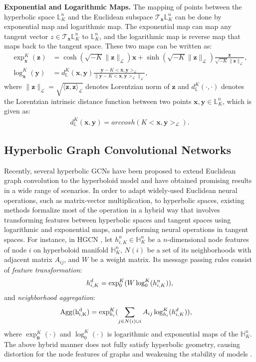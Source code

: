 \documentclass[sigconf]{acmart}
\newcommand{\Lc}{\mathcal{L}}
\newcommand{\lorentz}{\mathbb{L}^n_K}
\newcommand{\linner}[2]{\langle \mathbf{#1},\mathbf{#2}\rangle_\Lc}
\newcommand{\tangent}[1]{\mathcal{T}_{\mathbf{#1}}\mathbb{L}^n_K}
\newcommand{\logmap}[2]{\log_#1^K(#2)}
\newcommand{\expmap}[2]{\exp_\mathbf{#1}^K(\mathbf{#2})}
\begin{document}
\noindent\textbf{Exponential and Logarithmic Maps.} The mapping of points between the hyperbolic space $\lorentz$ and the Euclidean subspace $\tangent{x}$ can be done by exponential map and logarithmic map. The exponential map can map any tangent vector $z\in\tangent{x}$ to $\lorentz$, and the logarithmic map is reverse map that maps back to the tangent space. These two maps can be written as:
\begin{align}
\label{eq4}
\expmap{x}{z} &= \cosh(\sqrt{-K}\lVert\mathbf{z}\rVert_\Lc)\mathbf{x} + \sinh(\sqrt{-K}\lVert\mathbf{z}\rVert_\Lc)\frac{\mathbf{z}}{\sqrt{-K}\lVert\mathbf{z}\rVert_\Lc},\\
\label{eq5}
\logmap{\mathbf{x}}{\mathbf{y}} &= d_{\mathbb{L}}^{K}(\mathbf{x},\mathbf{y})\frac{\mathbf{y}-K<\mathbf{x},\mathbf{y}>_{\mathcal{L}}}{\lVert \mathbf{y}-K<\mathbf{x},\mathbf{y}>_{\mathcal{L}}\rVert _{\mathcal{L}}},
\end{align}
where $\lVert\mathbf{z}\rVert_\Lc = \sqrt{\linner{z}{z}}$ denotes Lorentzian norm of $\mathbf{z}$ and $ d_{\mathbb{L}}^{K}(\cdot,\cdot)$ denotes the Lorentzian intrinsic distance function between two points $\mathbf{x},\mathbf{y}\in \lorentz$, which is given as:
\begin{align}
\label{eq6}
d_{\mathbb{L}}^{K}(\mathbf{x},\mathbf{y}) = arccosh(K<\mathbf{x},\mathbf{y}>_{\mathcal{L}}).
\end{align}

\subsection{Hyperbolic Graph Convolutional Networks}
Recently, several hyperbolic GCNs have been proposed to extend Euclidean graph convolution to the hyperboloid model and have obtained promising results in a wide range of scenarios\cite{c:14}. In order to adapt widely-used Euclidean neural operations, such as matrix-vector multiplication, to hyperbolic spaces, existing methods formalize most of the operation in a hybrid way that involves transforming features between hyperbolic spaces and tangent spaces using logarithmic and exponential maps, and performing neural operations in tangent spaces. For instance, in HGCN \cite{c:13}, let $h_{i,K}^{n} \in\mathbb{H}_{K}^{n}$ be a $n$-dimensional node features of node $i$ on hyperboloid manifold $\mathbb{H}_{K}^{n}$, $N(i)$ be a set of its neighborhoods with adjacent matrix $A_{ij}$, and $W$ be a weight matrix. Its message passing rules consist of \emph{feature transformation}:
\begin{align}
\label{eq7}
    h_{i,K}^{d} = {\rm exp}_{0}^{K}({   W\logmap{0}{h_{i,K}^n}   }),
\end{align}
and \emph{neighborhood aggregation}:
\begin{align}
\label{eq8}
    \rm{Agg}(h_{i,K}^d) &= {\rm exp}_{h_i}^{K}({\sum_{j\in N(i)\cup{i}} {A_{ij} \logmap{{h_i}}{{h_{i,K}^d}} }} ),
\end{align}
where $\expmap{0}{\cdot}$ and $\logmap{0}{\cdot}$ is logarithmic and exponential maps of the $\mathbb{H}_{K}^{n}$. The above hybrid manner does not fully satisfy hyperbolic geometry, causing distortion for the node features of graphs and weakening the stability of models \cite{c:15, c:16}. 
\end{document}
